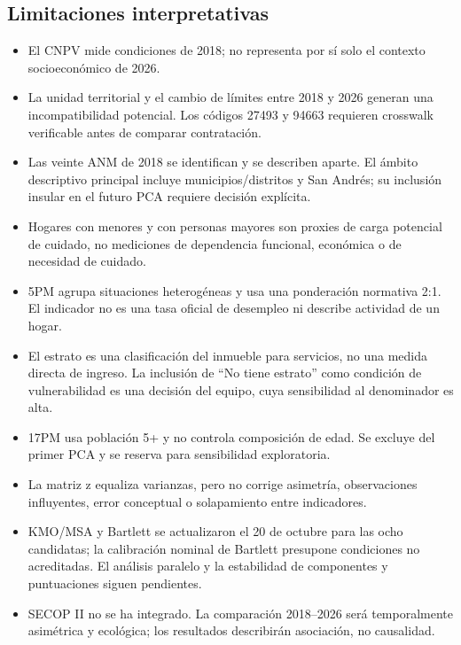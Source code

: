 \subsection{Limitaciones interpretativas}

\begin{itemize}[leftmargin=1.27cm]
  \item El CNPV mide condiciones de 2018; no representa por sí solo el contexto socioeconómico de 2026.
  \item La unidad territorial y el cambio de límites entre 2018 y 2026 generan una incompatibilidad potencial. Los códigos 27493 y 94663 requieren crosswalk verificable antes de comparar contratación.
  \item Las veinte ANM de 2018 se identifican y se describen aparte. El ámbito descriptivo principal incluye municipios/distritos y San Andrés; su inclusión insular en el futuro PCA requiere decisión explícita.
  \item Hogares con menores y con personas mayores son proxies de carga potencial de cuidado, no mediciones de dependencia funcional, económica o de necesidad de cuidado.
  \item 5PM agrupa situaciones heterogéneas y usa una ponderación normativa 2:1. El indicador no es una tasa oficial de desempleo ni describe actividad de un hogar.
  \item El estrato es una clasificación del inmueble para servicios, no una medida directa de ingreso. La inclusión de \enquote{No tiene estrato} como condición de vulnerabilidad es una decisión del equipo, cuya sensibilidad al denominador es alta.
  \item 17PM usa población 5+ y no controla composición de edad. Se excluye del primer PCA y se reserva para sensibilidad exploratoria.
  \item La matriz z equaliza varianzas, pero no corrige asimetría, observaciones influyentes, error conceptual o solapamiento entre indicadores.
  \item KMO/MSA y Bartlett se actualizaron el 20 de octubre para las ocho candidatas; la calibración nominal de Bartlett presupone condiciones no acreditadas. El análisis paralelo y la estabilidad de componentes y puntuaciones siguen pendientes.
  \item SECOP II no se ha integrado. La comparación 2018--2026 será temporalmente asimétrica y ecológica; los resultados describirán asociación, no causalidad.
\end{itemize}


